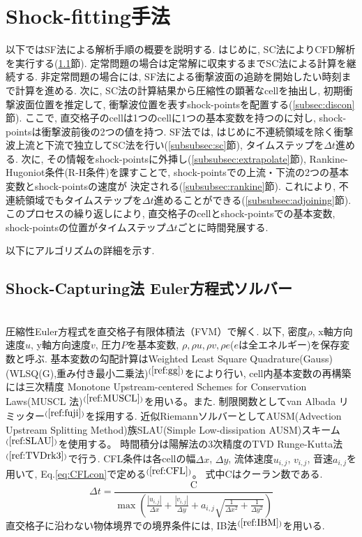 \documentclass[a4j]{jarticle}
\begin{document}
\section{Shock-fitting手法} \label{sec:method}
以下ではSF法による解析手順の概要を説明する.
はじめに, SC法によりCFD解析を実行する(\ref{subsec:sc}節).
定常問題の場合は定常解に収束するまでSC法による計算を継続する.
非定常問題の場合には, SF法による衝撃波面の追跡を開始したい時刻まで計算を進める. 
次に, SC法の計算結果から圧縮性の顕著なcellを抽出し, 初期衝撃波面位置を推定して, 
衝撃波位置を表すshock-pointsを配置する(\ref{subsec:discon}節).
ここで, 直交格子のcellは1つのcellに1つの基本変数を持つのに対し, shock-pointsは衝撃波前後の2つの値を持つ.
SF法では, はじめに不連続領域を除く衝撃波上流と下流で独立してSC法を行い(\ref{subsubsec:sc}節), タイムステップを$\Delta t$進める.
次に, その情報をshock-pointsに外挿し(\ref{subsubsec:extrapolate}節), Rankine-Hugoniot条件(R-H条件)を課すことで, shock-pointsでの上流・下流の2つの基本変数とshock-pointsの速度が
決定される(\ref{subsubsec:rankine}節). これにより, 不連続領域でもタイムステップを$\Delta t$進めることができる(\ref{subsubsec:adjoining}節). 
このプロセスの繰り返しにより, 直交格子のcellとshock-pointsでの基本変数, shock-pointsの位置がタイムステップ$\Delta t$ごとに時間発展する. 

以下にアルゴリズムの詳細を示す.

\subsection{Shock-Capturing法 Euler方程式ソルバー} \label{subsec:sc}
\mbox{}\\[-3.0ex]

圧縮性Euler方程式を直交格子有限体積法（FVM）で解く.
以下, 密度$\rho$, x軸方向速度$u$, y軸方向速度$v$, 圧力$P$を基本変数,
$\rho, \rho u, \rho v, \rho e$($e$は全エネルギー)を保存変数と呼ぶ.
基本変数の勾配計算はWeighted Least Square Quadrature(Gauss)(WLSQ(G),重み付き最小二乗法)$^{(\ref{ref:gg})}$をにより行い, cell内基本変数の再構築には三次精度 Monotone Upstream-centered
Schemes for Conservation Laws(MUSCL 法)$^{(\ref{ref:MUSCL})}$を用いる。また. 制限関数としてvan Albada リミッター$^{(\ref{ref:fuji})}$を採用する.
近似RiemannソルバーとしてAUSM(Advection Upstream Splitting Method)族SLAU(Simple Low-dissipation AUSM)スキーム$^{(\ref{ref:SLAU})}$を使用する。
時間積分は陽解法の3次精度のTVD Runge-Kutta法$^{(\ref{ref:TVDrk3})}$で行う.
CFL条件は各cellの幅$\Delta x$, $\Delta y$, 流体速度$u_{i,j}$, $v_{i,j}$, 音速$a_{i, j}$を用いて, Eq.\ref{eq:CFLcon}で定める$^{(\ref{ref:CFL})}$。
式中$\mathrm{C}$はクーラン数である.
\begin{equation}
    \Delta t =
    \frac{\mathrm{C}}{
        \max\left(
            \frac{|u_{i,j}|}{\Delta x}
            + \frac{|v_{i,j}|}{\Delta y}
            + a_{i,j}
              \sqrt{
                \frac{1}{\Delta x^2}
                + \frac{1}{\Delta y^2}
              }
        \right)
    }
    \label{eq:CFLcon}
\end{equation}
直交格子に沿わない物体境界での境界条件には, IB法$^{(\ref{ref:IBM})}$を用いる.
\end{document}
